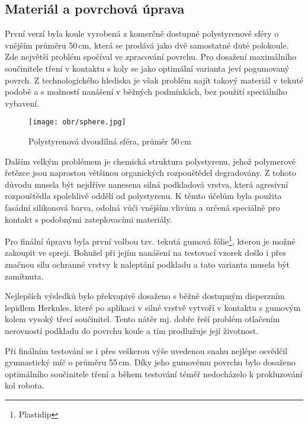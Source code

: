 \subsection{Materiál a povrchová úprava}
\label{povrch}

První verzí byla koule vyrobená z komerčně dostupné polystyrenové sféry o vnějším průměru 50\,cm, která se prodává jako dvě samostatné duté polokoule. Zde největší problém spočíval ve zpracování povrchu. Pro dosažení maximálního součinitele tření v kontaktu s koly se jako optimální varianta jeví pogumovaný povrch. Z technologického hlediska je však problém najít takový materiál v tekuté podobě a s možností nanášení v běžných podmínkách, bez použití speciálního vybavení.
\vspace{5mm}
\begin{figure}[hb]
\begin{center}
\texttt{[image: obr/sphere.jpg]}
\end{center}
\vspace{5mm}
\caption{Polystyrenová dvoudílná sféra, průměr 50\,cm \cite{polyy}}
\label{cocka}
\end{figure}

Dalším velkým problémem je chemická struktura polystyrenu, jehož polymerové řetězce jsou naprostou většinou organických rozpouštědel degradovány. Z tohoto důvodu musela být nejdříve nanesena silná podkladová vrstva, která agresivní rozpouštědla spolehlivě oddělí od polystyrenu. K těmto účelům byla použita fasádní silikonová barva, odolná vůči vnějším vlivům a určená speciálně pro kontakt s podobnými zateplovacími materiály. 

Pro finální úpravu byla první volbou tzv. tekutá gumová fólie\footnote{Plastidip}, kterou je možné zakoupit ve spreji. Bohužel při jejím nanášení na testovací vzorek došlo i přes značnou sílu ochranné vrstvy k naleptání podkladu a tato varianta musela být zamítnuta.

Nejlepších výsledků bylo překvapivě dosaženo s běžně dostupným disperzním lepidlem Herkules, které po aplikaci v silné vrstvě vytvoří v kontaktu s gumovým kolem vysoký třecí součinitel. Tento nátěr mj. dobře řeší problém otlačením nerovností podkladu do povrchu koule a tím prodlužuje její životnost.

\newpage

Při finálním testování se i přes veškerou výše uvedenou snahu nejlépe osvědčil gymnastický míč o průměru 55\,cm. Díky jeho gumovému povrchu bylo dosaženo optimálního součinitele tření a během testování téměř nedocházelo k prokluzování kol robota.


